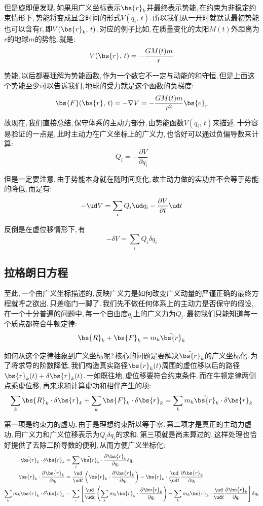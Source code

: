 但是旋即便发现,\,如果用广义坐标表示$\bs{r}_k$并最终表示势能,\,在约束为非稳定约束情形下,\,势能将变成显含时间的形式$V(q_i,\,t)$.\,所以我们从一开时就默认最初势能也可以含有$t$,\,即$V(\bs{r}_k,\,t)$.\,对应的例子比如,\,在质量变化的太阳$M(t)$外距离为$r$的地球$m$的势能,\,就是:
\[V(\bs{r},\,t)=-\frac{GM(t)m}{r}\]

势能,\,以后都要理解为势能函数,\,作为一个数它不一定与动能的和守恒,\,但是上面这个势能至少可以告诉我们,\,地球的受力就是这个函数的负梯度:
\[\bs{F}(\bs{r},\,t)=-\nabla V=-\frac{GM(t)m}{r^2}\bs{e}_r\]

故现在,\,我们直接总结,\,保守体系的主动力部分,\,由势能函数$V(q_i,\,t)$来描述.\,十分容易验证的一点是,\,此时主动力在广义坐标上的广义力,\,也恰好可以通过负偏导数来计算:
\[Q_i=-\frac{\partial V}{\partial q_i}\]

但是一定要注意,\,由于势能本身就在随时间变化,\,故主动力做的实功并不会等于势能的降低,\,而是有:
\[-\ud V=\sum_i Q_i\ud q_i -\frac{\partial V}{\partial t}\ud t\]

反倒是在虚位移情形下,\,有
\[-\delta V=\sum_i Q_i\delta q_i\]


\subsection{拉格朗日方程}

至此,\,一个由广义坐标描述的,\,反映广义力是如何改变广义动量的严谨正确的最终方程就呼之欲出,\,只差临门一脚了.\,我们先不做任何体系上的主动力是否保守的假设,\,在一个十分普遍的问题中,\,每一个自由度$q_i$上的广义力为$Q_i$.\,最初我们只能知道每一个质点都符合牛顿定律:
\[\bs{R}_k+\bs{F}_k=m_k \ddot{\bs{r}}_k\]

如何从这个定律抽象到广义坐标呢?\,核心的问题是要解决$\ddot{\bs{r}}_k$的广义坐标化.\,为了将求导的阶数降低,\,我们构造真实路径$\bs{r}_k(t)$周围的虚位移以后的路径$\bs{r}_k(t)+\delta \bs{r}_k(t)$.\,一如既往地,\,虚位移要符合约束条件.\,而在牛顿定律两侧点乘虚位移,\,再来求和计算虚功和相伴产生的项:
\[\sum_k\bs{R}_k\cdot \delta \bs{r}_k+\sum_k\bs{F}_k\cdot \delta \bs{r}_k=\sum_k m_k \ddot{\bs{r}}_k\cdot \delta \bs{r}_k\]

第一项是约束力的虚功,\,由于是理想约束所以等于零.\,第二项才是真正的主动力虚功,\,用广义力和广义位移表示为$Q_i\delta q_i$的求和.\,第三项就是尚未算过的,\,这样处理也恰好提供了去除二阶导数的便利,\,从而方便广义坐标化:
\begin{align*}
\ddot{\bs{r}}_k\cdot \delta \bs{r}_k  	&=\sum_i\ddot{\bs{r}}_k\cdot \frac{\partial \bs{r}_k}{\partial q_i}\delta q_i\\
\ddot{\bs{r}}_k\cdot \frac{\partial \bs{r}_k}{\partial q_i}&=\frac{\ud }{\ud t}\left(\dot {\bs{r}}_k\cdot \frac{\partial \bs{r}_k}{\partial q_i}\right)- \dot {\bs{r}}_k\cdot \frac{\ud }{\ud t}\frac{\partial \bs{r}_k}{\partial q_i}\\
\sum_k m_k \ddot{\bs{r}}_k\cdot \delta \bs{r}_k&=\sum_i\left[\frac{\ud }{\ud t}\left(\sum_k m_k\dot {\bs{r}}_k\cdot \frac{\partial \bs{r}_k}{\partial q_i}\right)- \sum_k m_k\dot {\bs{r}}_k\cdot \frac{\ud }{\ud t}\frac{\partial \bs{r}_k}{\partial q_i}\right]\delta q_i
\end{align*}

